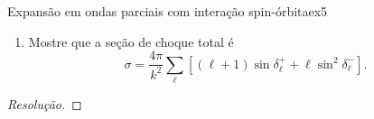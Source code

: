 \begin{exercício}{Expansão em ondas parciais com interação spin-órbita\cite{gottfried}}{ex5}
\begin{enumerate}[label=(\alph*)]
          \begin{equation*}
             g(k,\theta) = \frac1k \sum_{\ell = 0}^\infty \left(\frac{4\pi}{2\ell + 1}\right)^{\frac12} \left[(\ell + 1) a_\ell^+ + \ell a_\ell^-\right]Y_{\ell 0}(\theta)
          \end{equation*}
          e
          \begin{equation*}
             h(k,\theta) = \frac1k \sum_{\ell = 0}^\infty \left(\frac{4\pi}{2\ell + 1}\right)^{\frac12} \left[a_\ell^+ - a_\ell^-\right]i\sin\theta\diff*{Y_{\ell 0}(\theta)}{\cos\theta},
          \end{equation*}
          onde \(a_{\ell}^\pm = e^{i \delta_{\ell}^\pm} \sin\delta_{\ell}^{\pm}.\)
       \item Mostre que a seção de choque total é
          \begin{equation*}
             \sigma = \frac{4\pi}{k^2} \sum_{\ell} \left[(\ell + 1)\sin\delta^+_\ell + \ell \sin^2 \delta_\ell^-\right].
          \end{equation*}
   \end{enumerate}
\end{exercício}
\begin{proof}[Resolução]
    
\end{proof}

